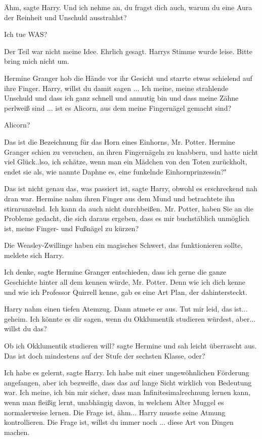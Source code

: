 \glqq Ähm\grqq{}, sagte Harry. \glqq Und ich nehme an, du fragst dich auch,
warum du eine Aura der Reinheit und Unschuld ausstrahlst?\grqq{}

\glqq Ich tue WAS?\grqq{}

\glqq Der Teil war nicht meine Idee. Ehrlich gesagt.\grqq{} Harrys Stimme wurde
leise. \glqq Bitte bring mich nicht um.\grqq{}

Hermine Granger hob die Hände vor ihr Gesicht und starrte etwas schielend auf
ihre Finger. \glqq Harry, willst du damit sagen ... Ich meine, meine strahlende
Unschuld und dass ich ganz schnell und anmutig bin und dass meine Zähne perlweiß
sind ... ist es Alicorn, aus dem meine Fingernägel gemacht sind?\grqq{}

\glqq Alicorn?\grqq{}

\glqq Das ist die Bezeichnung für das Horn eines Einhorns, Mr. Potter.\grqq{}
Hermine Granger schien zu versuchen, an ihren Fingernägeln zu knabbern, und
hatte nicht viel Glück.\grqq{}.lso, ich schätze, wenn man ein Mädchen von den
Toten zurückholt, endet sie als, wie nannte Daphne es, eine funkelnde
Einhornprinzessin?"

\glqq Das ist nicht genau das, was passiert ist\grqq{}, sagte Harry, obwohl es
erschreckend nah dran war. Hermine nahm ihren Finger aus dem Mund und
betrachtete ihn stirnrunzelnd. \glqq Ich kann da auch nicht durchbeißen. Mr.
Potter, haben Sie an die Probleme gedacht, die sich daraus ergeben, dass es mir
buchstäblich unmöglich ist, meine Finger- und Fußnägel zu kürzen?\grqq{}

\glqq Die Weasley-Zwillinge haben ein magisches Schwert, das funktionieren
sollte\grqq{}, meldete sich Harry.

\glqq Ich denke\grqq{}, sagte Hermine Granger entschieden, \glqq dass ich gerne
die ganze Geschichte hinter all dem kennen würde, Mr. Potter. Denn wie ich dich
kenne und wie ich Professor Quirrell kenne, gab es eine Art Plan, der
dahintersteckt.\grqq{}

Harry nahm einen tiefen Atemzug. Dann atmete er aus. \glqq Tut mir leid, das
ist... geheim. Ich könnte es dir sagen, wenn du Okklumentik studieren würdest,
aber... willst du das?\grqq{}

\glqq Ob ich Okklumentik studieren will?\grqq{} sagte Hermine und sah leicht
überrascht aus. \glqq Das ist doch mindestens auf der Stufe der sechsten Klasse,
oder?\grqq{}

\glqq Ich habe es gelernt\grqq{}, sagte Harry. \glqq Ich habe mit einer
ungewöhnlichen Förderung angefangen, aber ich bezweifle, dass das auf lange
Sicht wirklich von Bedeutung war. Ich meine, ich bin mir sicher, dass man
Infinitesimalrechnung lernen kann, wenn man fleißig lernt, unabhängig davon, in
welchem Alter Muggel es normalerweise lernen. Die Frage ist, ähm...\grqq{} Harry
musste seine Atmung kontrollieren. \glqq Die Frage ist, willst du immer noch ...
diese Art von Dingen machen.\grqq{}

